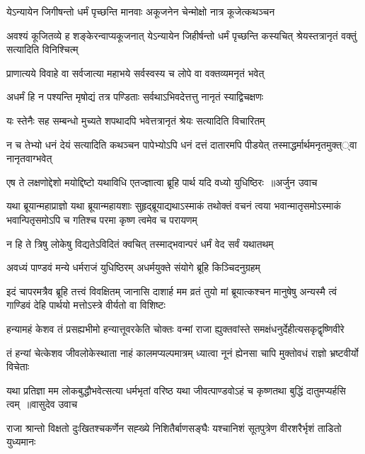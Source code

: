 \twolineshloka
{येऽन्यायेन जिगीषन्तो धर्मं पृच्छन्ति मानवाः}
{अकूजनेन चेन्मोक्षो नात्र कूजेत्कथञ्चन}


\threelineshloka
{अवश्यं कूजितव्ये ह शङ्केरन्वाप्यकूजनात्}
{येऽन्यायेन जिहीर्षन्तो धर्मं पृच्छन्ति कस्यचित्}
{श्रेयस्तत्रानृतं वक्तुं सत्यादिति विनिश्चित्म्}


\twolineshloka
{प्राणात्यये विवाहे वा सर्वजात्या महाभये}
{सर्वस्वस्य च लोपे वा वक्तव्यमनृतं भवेत्}


\twolineshloka
{अधर्मं हि न पश्यन्ति मृषोद्यं तत्र पण्डिताः}
{सर्वथाऽभिवदेत्तत्तु नानृतं स्याद्विचक्षणः}


\twolineshloka
{यः स्तेनैः सह सम्बन्धो मुच्यते शपथादपि}
{भवेत्तत्रानृतं श्रेयः सत्यादिति विचारितम्}


\threelineshloka
{न च तेभ्यो धनं देयं सत्यादिति कथञ्चन}
{पापेभ्योऽपि धनं दत्तं दातारमपि पीडयेत्}
{तस्माद्धर्मार्थमनृतमुक्त््वा नानृतवाग्भवेत्}


\threelineshloka
{एष ते लक्षणोद्देशो मयोद्दिष्टो यथाविधि}
{एतज्ज्ञात्वा ब्रूहि पार्थ यदि वध्यो युधिष्ठिरः ॥अर्जुन उवाच}
{}


यथा ब्रूयान्महाप्राज्ञो यथा ब्रूयान्महायशाः
\threelineshloka
{सुहृद्ब्रूयाद्यथाऽस्माकं तथोक्तं वचनं त्वया}
{भवान्मातृसमोऽस्माकं भवान्पितृसमोऽपि च}
{गतिश्च परमा कृष्ण त्वमेव च परायणम्}


\twolineshloka
{न हि ते त्रिषु लोकेषु विद्यतेऽविदितं क्वचित्}
{तस्माद्भवान्परं धर्मं वेद सर्वं यथातथम्}


\twolineshloka
{अवध्यं पाण्डवं मन्ये धर्मराजं युधिष्ठिरम्}
{अधर्मयुक्ते संयोगे ब्रूहि किञ्चिदनुग्रहम्}


इदं चापरमत्रैव ब्रूहि तत्त्वं विवक्षितम्
\twolineshloka
{जानासि दाशार्ह मम व्रतं तुयो मां ब्रूयात्कश्चन मानुषेषु}
{अन्यस्मै त्वं गाण्डिवं देहि पार्थयो मत्तोऽस्त्रे वीर्यतो वा विशिष्टः}


\twolineshloka
{हन्यामहं केशव तं प्रसह्यभीमो हन्यात्तूवरकेति चोक्तः}
{वन्मां राजा ह्युक्तवांस्ते समक्षंधनुर्देहीत्यसकृद्वृष्णिवीरे}


\twolineshloka
{तं हन्यां चेत्केशव जीवलोकेस्थाता नाहं कालमप्यल्पमात्रम्}
{ध्यात्वा नूनं ह्येनसा चापि मुक्तोवधं राज्ञो भ्रष्टवीर्यो विचेताः}


\threelineshloka
{यथा प्रतिज्ञा मम लोकबुद्धौभवेत्सत्या धर्मभृतां वरिष्ठ}
{यथा जीवत्पाण्डवोऽहं च कृष्णतथा बुद्धिं दातुमप्यर्हसि त्वम् ॥वासुदेव उवाच}
{}


\twolineshloka
{राजा श्रान्तो विक्षतो दुःखितश्चकर्णेन सह्ख्ये निशितैर्बाणसङ्घैः}
{यश्चानिशं सूतपुत्रेण वीरशरैर्भृशं ताडितो युध्यमानः}


